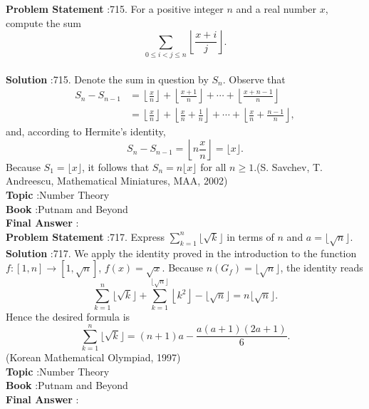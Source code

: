 \documentclass[10pt]{article}
\begin{document}
\textbf{Problem Statement} :715. For a positive integer $n$ and a real number $x$, compute the sum$$ \sum_{0 \leq i<j \leq n}\left\lfloor\frac{x+i}{j}\right\rfloor . $$\\
\textbf{Solution} :715. Denote the sum in question by $S_{n}$. Observe that$$ \begin{aligned} S_{n}-S_{n-1} &=\left\lfloor\frac{x}{n}\right\rfloor+\left\lfloor\frac{x+1}{n}\right\rfloor+\cdots+\left\lfloor\frac{x+n-1}{n}\right\rfloor \\ &=\left\lfloor\frac{x}{n}\right\rfloor+\left\lfloor\frac{x}{n}+\frac{1}{n}\right\rfloor+\cdots+\left\lfloor\frac{x}{n}+\frac{n-1}{n}\right\rfloor, \end{aligned} $$and, according to Hermite's identity,$$ S_{n}-S_{n-1}=\left\lfloor n \frac{x}{n}\right\rfloor=\lfloor x\rfloor . $$Because $S_{1}=\lfloor x\rfloor$, it follows that $S_{n}=n\lfloor x\rfloor$ for all $n \geq 1$.(S. Savchev, T. Andreescu, Mathematical Miniatures, MAA, 2002)\\
\textbf{Topic} :Number Theory\\
\textbf{Book} :Putnam and Beyond\\
\textbf{Final Answer} :\\


\textbf{Problem Statement} :717. Express $\sum_{k=1}^{n}\lfloor\sqrt{k}\rfloor$ in terms of $n$ and $a=\lfloor\sqrt{n}\rfloor$.\\
\textbf{Solution} :717. We apply the identity proved in the introduction to the function $f:[1, n] \rightarrow[1, \sqrt{n}]$, $f(x)=\sqrt{x}$. Because $n\left(G_{f}\right)=\lfloor\sqrt{n}\rfloor$, the identity reads$$ \sum_{k=1}^{n}\lfloor\sqrt{k}\rfloor+\sum_{k=1}^{\lfloor\sqrt{n}\rfloor}\left\lfloor k^{2}\right\rfloor-\lfloor\sqrt{n}\rfloor=n\lfloor\sqrt{n}\rfloor . $$Hence the desired formula is$$ \sum_{k=1}^{n}\lfloor\sqrt{k}\rfloor=(n+1) a-\frac{a(a+1)(2 a+1)}{6} . $$(Korean Mathematical Olympiad, 1997)\\
\textbf{Topic} :Number Theory\\
\textbf{Book} :Putnam and Beyond\\
\textbf{Final Answer} :\\
\end{document}
